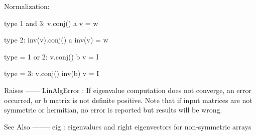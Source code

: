 \begin{DoxyVerb}
    Normalization:

        type 1 and 3: v.conj() a      v  = w

        type 2: inv(v).conj() a  inv(v) = w

        type = 1 or 2: v.conj() b      v  = I

        type = 3: v.conj() inv(b) v  = I

Raises
------
LinAlgError :
    If eigenvalue computation does not converge,
    an error occurred, or b matrix is not definite positive. Note that
    if input matrices are not symmetric or hermitian, no error is reported
    but results will be wrong.

See Also
--------
eig : eigenvalues and right eigenvectors for non-symmetric arrays\end{DoxyVerb}
 \hypertarget{namespacescipy_1_1linalg_1_1decomp_a0e88e13f255d5a6600817acbaf692d39}{}
